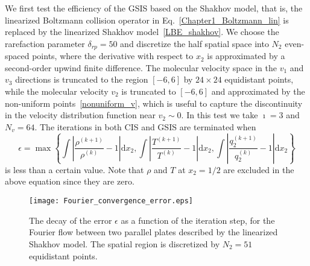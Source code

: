 We first test the efficiency of the GSIS based on the Shakhov model, that is, the linearized Boltzmann collision operator in Eq.~\eqref{Chapter1_Boltzmann_lin} is replaced by the linearized Shakhov model~\eqref{LBE_shakhov}. We choose the rarefaction parameter $\delta_{rp}=50$ and discretize the half spatial space into $N_2$ even-spaced points, where the derivative with respect to $x_2$ is approximated by a second-order upwind finite difference. The molecular velocity space in the $v_1$ and $v_3$ directions is truncated to the region $[-6, 6]$ by $24\times24$ equidistant points, while the molecular velocity $v_2$ is truncated to $[-6,6]$ and approximated by the non-uniform points~\eqref{nonuniform_v},
which is useful to capture the discontinuity in the velocity distribution function near $v_2\sim0$. In this test we take $\imath=3$ and $N_v=64$. The iterations in both CIS and GSIS are terminated when 
\begin{equation}\label{epsilon_Fourier}
\epsilon= \max\left\{
\int{}\left|\frac{\rho^{(k+1)}}{\rho^{(k)}}-1\right|\mathrm{d}x_2, 
\int{}\left|\frac{T^{(k+1)}}{T^{(k)}}-1\right|\mathrm{d}x_2,
\int{}\left|\frac{q_2^{(k+1)}}{q_2^{(k)}}-1\right|\mathrm{d}x_2
\right\}
\end{equation}
is less than a certain value. Note that  $\rho$ and $T$  at $x_2=1/2$ are excluded in the above equation since they are zero.



\begin{figure}[t]
	\centering
	\texttt{[image: Fourier\_convergence\_error.eps]}
	\caption{The decay of the error $\epsilon$ as a function of the iteration step, for the Fourier flow between two parallel plates described by the linearized Shakhov model. The spatial region is discretized by $N_2=51$ equidistant points.  }
	\label{fig:Fourier_speed}
\end{figure}

